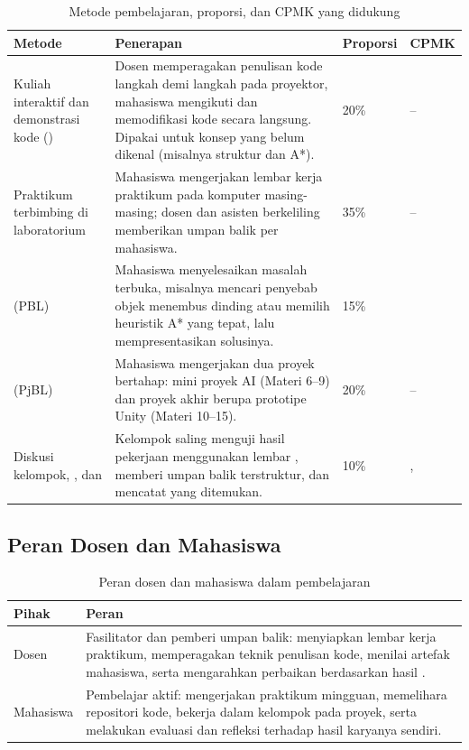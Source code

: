 \begin{table}[htbp]
\centering
\caption{Metode pembelajaran, proporsi, dan CPMK yang didukung}
\label{tab:metode}
\begin{tabularx}{\textwidth}{@{}L{3.8cm} Y C{1.7cm} L{2.6cm}@{}}
\toprule
\headrow \textbf{Metode} & \textbf{Penerapan} & \textbf{Proporsi} & \textbf{CPMK} \\
\midrule
Kuliah interaktif dan demonstrasi kode () &
Dosen memperagakan penulisan kode langkah demi langkah pada proyektor, mahasiswa mengikuti dan memodifikasi kode secara langsung. Dipakai untuk konsep yang belum dikenal (misalnya struktur  dan A*). &
20\% & -- \\
\addlinespace
Praktikum terbimbing di laboratorium &
Mahasiswa mengerjakan lembar kerja praktikum pada komputer masing-masing; dosen dan asisten berkeliling memberikan umpan balik per mahasiswa. &
35\% & -- \\
\addlinespace
{} (PBL) &
Mahasiswa menyelesaikan masalah terbuka, misalnya mencari penyebab objek menembus dinding atau memilih heuristik A* yang tepat, lalu mempresentasikan solusinya. &
15\% &  \\
\addlinespace
{} (PjBL) &
Mahasiswa mengerjakan dua proyek bertahap: mini proyek AI (Materi 6--9) dan proyek akhir berupa prototipe Unity (Materi 10--15). &
20\% & -- \\
\addlinespace
Diskusi kelompok, , dan  &
Kelompok saling menguji hasil pekerjaan menggunakan lembar , memberi umpan balik terstruktur, dan mencatat  yang ditemukan. &
10\% & ,  \\
\bottomrule
\end{tabularx}
\end{table}

\subsection{Peran Dosen dan Mahasiswa}

\begin{table}[htbp]
\centering
\caption{Peran dosen dan mahasiswa dalam pembelajaran}
\label{tab:peran}
\begin{tabularx}{\textwidth}{@{}L{3.6cm} Y@{}}
\toprule
\headrow \textbf{Pihak} & \textbf{Peran} \\
\midrule
Dosen &
Fasilitator dan pemberi umpan balik: menyiapkan lembar kerja praktikum, memperagakan teknik penulisan kode, menilai artefak mahasiswa, serta mengarahkan perbaikan berdasarkan hasil . \\
\addlinespace
Mahasiswa &
Pembelajar aktif: mengerjakan praktikum mingguan, memelihara repositori kode, bekerja dalam kelompok pada proyek, serta melakukan evaluasi dan refleksi terhadap hasil karyanya sendiri. \\
\bottomrule
\end{tabularx}
\end{table}
